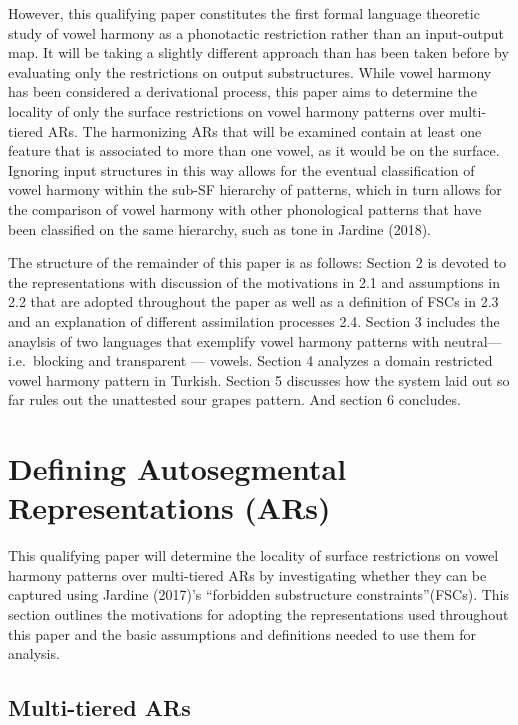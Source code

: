 \documentclass[,doc,floatsintext]{apa6}
\theoremstyle{definition}
\theoremstyle{definition}
\theoremstyle{definition}
\theoremstyle{remark}
\begin{document}
However, this qualifying paper constitutes the first formal language
theoretic study of vowel harmony as a phonotactic restriction rather
than an input-output map. It will be taking a slightly different
approach than has been taken before by evaluating only the restrictions
on output substructures. While vowel harmony has been considered a
derivational process, this paper aims to determine the locality of only
the surface restrictions on vowel harmony patterns over multi-tiered
ARs. The harmonizing ARs that will be examined contain at least one
feature that is associated to more than one vowel, as it would be on the
surface. Ignoring input structures in this way allows for the eventual
classification of vowel harmony within the sub-SF hierarchy of patterns,
which in turn allows for the comparison of vowel harmony with other
phonological patterns that have been classified on the same hierarchy,
such as tone in Jardine (2018).

The structure of the remainder of this paper is as follows: Section 2 is
devoted to the representations with discussion of the motivations in 2.1
and assumptions in 2.2 that are adopted throughout the paper as well as
a definition of FSCs in 2.3 and an explanation of different assimilation
processes 2.4. Section 3 includes the anaylsis of two languages that
exemplify vowel harmony patterns with neutral--- i.e.~blocking and
transparent --- vowels. Section 4 analyzes a domain restricted vowel
harmony pattern in Turkish. Section 5 discusses how the system laid out
so far rules out the unattested sour grapes pattern. And section 6
concludes.

\section{Defining Autosegmental Representations
(ARs)}\label{defining-autosegmental-representations-ars}

This qualifying paper will determine the locality of surface
restrictions on vowel harmony patterns over multi-tiered ARs by
investigating whether they can be captured using Jardine (2017)'s
\enquote{forbidden substructure constraints}(FSCs). This section
outlines the motivations for adopting the representations used
throughout this paper and the basic assumptions and definitions needed
to use them for analysis.

\subsection{Multi-tiered ARs}\label{multi-tiered-ars}
\end{document}

